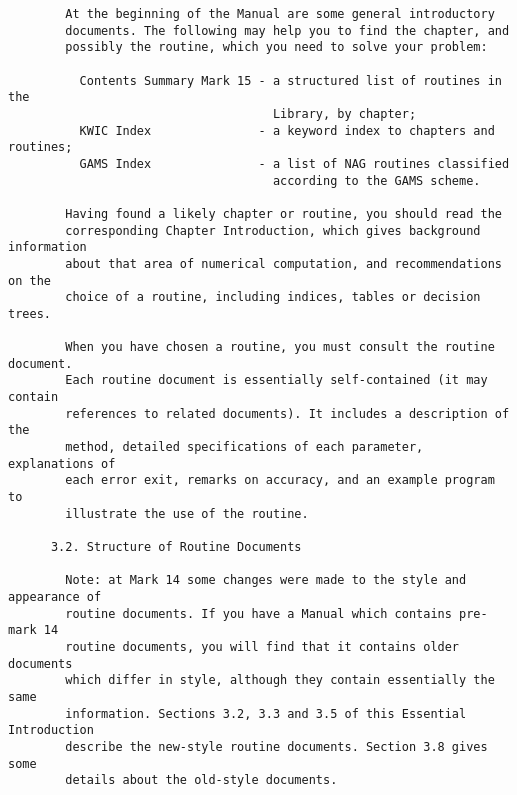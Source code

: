 \begin{small}
\begin{verbatim}
        At the beginning of the Manual are some general introductory              
        documents. The following may help you to find the chapter, and            
        possibly the routine, which you need to solve your problem:               
                                                                                  
          Contents Summary Mark 15 - a structured list of routines in the         
                                     Library, by chapter;                         
          KWIC Index               - a keyword index to chapters and routines;    
          GAMS Index               - a list of NAG routines classified            
                                     according to the GAMS scheme.                
                                                                                  
        Having found a likely chapter or routine, you should read the             
        corresponding Chapter Introduction, which gives background information    
        about that area of numerical computation, and recommendations on the      
        choice of a routine, including indices, tables or decision trees.         
                                                                                  
        When you have chosen a routine, you must consult the routine document.    
        Each routine document is essentially self-contained (it may contain       
        references to related documents). It includes a description of the        
        method, detailed specifications of each parameter, explanations of        
        each error exit, remarks on accuracy, and an example program to           
        illustrate the use of the routine.                                        
                                                                                  
      3.2. Structure of Routine Documents                                         
                                                                                  
        Note: at Mark 14 some changes were made to the style and appearance of    
        routine documents. If you have a Manual which contains pre-mark 14        
        routine documents, you will find that it contains older documents         
        which differ in style, although they contain essentially the same         
        information. Sections 3.2, 3.3 and 3.5 of this Essential Introduction     
        describe the new-style routine documents. Section 3.8 gives some          
        details about the old-style documents.                                    
                                                                                  

\end{verbatim}
\end{small}

